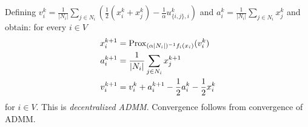 \documentclass[10pt,mathserif]{beamer}
\begin{document}
\begin{frame}
Defining $v_i^k = \frac{1}{|N_i|}\sum_{j\in N_i}\left(\frac{1}{2}(x_i^k+x_j^k) -\frac{1}{\alpha}u_{\{i,j\},i}^k\right)$ and $a_i^k = \frac{1}{|N_i|}\sum_{j\in N_i}x_j^{k}$ and obtain: for every $i \in V$
\begin{align*}
     x_i^{k+1} &= \prox_{(\alpha|N_i|)^{-1}f_i(x_i)}(v_i^k) \\%
      a_i^{k+1} &= \frac{1}{|N_i|}\sum_{j\in N_i}x_j^{k+1} \\
     v_i^{k+1} &= v_i^k + a_i^{k+1}-\frac{1}{2}a_i^k - \frac{1}{2}x_i^k%
\end{align*}
for $i\in V$.
This is \emph{decentralized ADMM}. Convergence follows from  convergence of ADMM.


\end{frame}
\end{document}
